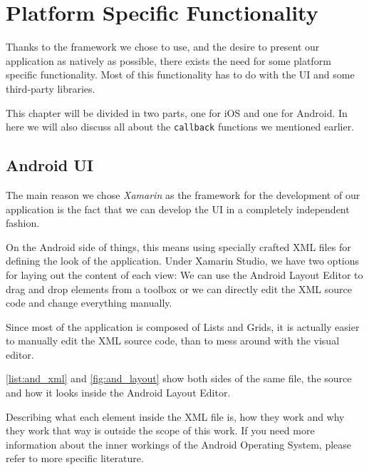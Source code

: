 \chapter{Platform Specific Functionality}\label{ch:ui}

Thanks to the framework we chose to use, and the desire to present our application as natively as possible, there exists the need for some platform specific functionality. Most of this functionality has to do with the \ac{UI} and some third-party libraries.

This chapter will be divided in two parts, one for iOS and one for Android. In here we will also discuss all about the \texttt{callback} functions we mentioned earlier. 

\section{Android UI}

The main reason we chose \textit{Xamarin} as the framework for the development of our application is the fact that we can develop the \ac{UI} in a completely independent fashion.

On the Android side of things, this means using specially crafted \ac{XML} files for defining the look of the application. Under Xamarin Studio, we have two options for laying out the content of each view:  We can use the Android Layout Editor to drag and drop elements from a toolbox or we can  directly edit the \ac{XML} source code and change everything manually.

Since most of the application is composed of Lists and Grids, it is actually easier to manually edit the \ac{XML} source code, than to mess around with the visual editor.

\autoref{list:and_xml} and \autoref{fig:and_layout} show both sides of the same file, the source and how it looks inside the Android Layout Editor.

Describing what each element inside the \ac{XML} file is, how they work and why they work that way is outside the scope of this work. If you need more information about the inner workings of the Android Operating System, please refer to more specific literature.


